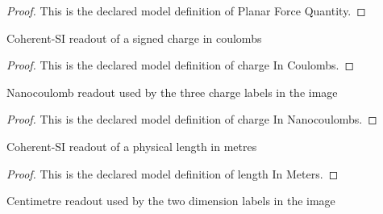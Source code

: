 \begin{proof}
  This is the declared model definition of Planar Force Quantity.
\end{proof}
\begin{definition}
  \label{def:physics:phyx-mini-0890:phyxminiproblems-problemphyxmini0890-chargeincoulombs}
  Coherent-SI readout of a signed charge in coulombs
\end{definition}
\begin{proof}
  This is the declared model definition of charge In Coulombs.
\end{proof}
\begin{definition}
  \label{def:physics:phyx-mini-0890:phyxminiproblems-problemphyxmini0890-chargeinnanocoulombs}
  Nanocoulomb readout used by the three charge labels in the image
\end{definition}
\begin{proof}
  This is the declared model definition of charge In Nanocoulombs.
\end{proof}
\begin{definition}
  \label{def:physics:phyx-mini-0890:phyxminiproblems-problemphyxmini0890-lengthinmeters}
  Coherent-SI readout of a physical length in metres
\end{definition}
\begin{proof}
  This is the declared model definition of length In Meters.
\end{proof}
\begin{definition}
  \label{def:physics:phyx-mini-0890:phyxminiproblems-problemphyxmini0890-lengthincentimeters}
  Centimetre readout used by the two dimension labels in the image
\end{definition}
